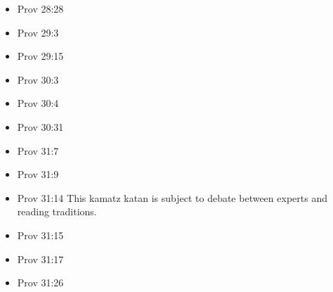 \documentclass[14pt]{article}
\begin{document}
\begin{multicols}{2}
\begin{itemize}
									\item Prov 28:28
									
									\item Prov 29:3
									
									\item Prov 29:15
									
									\item Prov 30:3
									
									\item Prov 30:4
									
									\item Prov 30:31
									
									\item Prov 31:7
									
									\item Prov 31:9
									
									\item Prov 31:14 This kamatz katan is subject to debate between experts and reading traditions.
									
									\item Prov 31:15
									
									\item Prov 31:17
									
									\item Prov 31:26
									
								\end{itemize}\end{multicols}
							
\end{document}
